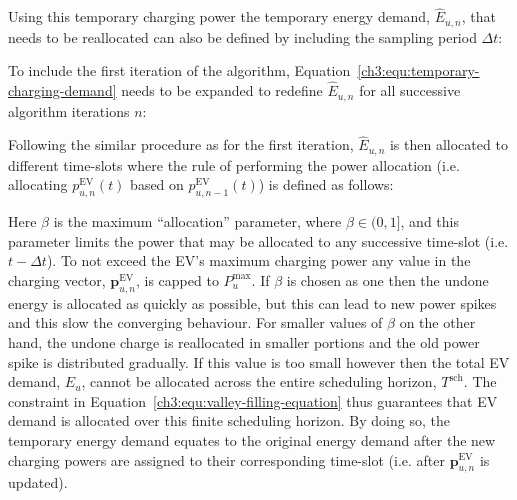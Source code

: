 

Using this temporary charging power the temporary energy demand, $\hat{E}_{u,n}$, that needs to be reallocated can also be defined by including the sampling period $\Delta t$:



To include the first iteration of the algorithm, Equation~\ref{ch3:equ:temporary-charging-demand} needs to be expanded to redefine $\hat{E}_{u,n}$ for all successive algorithm iterations $n$:



Following the similar procedure as for the first iteration, $\hat{E}_{u,n}$ is then allocated to different time-slots where the rule of performing the power allocation (i.e. allocating $p^\text{EV}_{u,n}(t)$ based on $p^\text{EV}_{u,n-1}(t)$) is defined as follows:



\nomenclature[K]{$\beta$}{Allocation parameter to assign a portion of the temporary energy demand, $\hat{E}_{u,n}$, where $\beta \in (0, 1]$}

Here $\beta$ is the maximum ``allocation'' parameter, where $\beta \in (0, 1]$, and this parameter limits the power that may be allocated to any successive time-slot (i.e. $t-\Delta t$).
To not exceed the EV's maximum charging power any value in the charging vector, $\textbf{p}^\text{EV}_{u,n}$, is capped to $P^\text{max}_{u}$.
If $\beta$ is chosen as one then the undone energy is allocated as quickly as possible, but this can lead to new power spikes and this slow the converging behaviour.
For smaller values of $\beta$ on the other hand, the undone charge is reallocated in smaller portions and the old power spike is distributed gradually.
If this value is too small however then the total EV demand, $E_u$, cannot be allocated across the entire scheduling horizon, $T^\text{sch}$.
The constraint in Equation~\ref{ch3:equ:valley-filling-equation} thus guarantees that EV demand is allocated over this finite scheduling horizon.
By doing so, the temporary energy demand equates to the original energy demand after the new charging powers are assigned to their corresponding time-slot (i.e. after $\textbf{p}^\text{EV}_{u,n}$ is updated).

